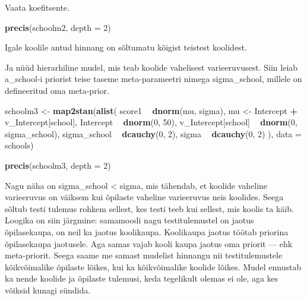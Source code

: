 \documentclass[]{book}
\newenvironment{Shaded}{\begin{snugshade}}{\end{snugshade}}
\newcommand{\DataTypeTok}[1]{\textcolor[rgb]{0.13,0.29,0.53}{#1}}
\newcommand{\DecValTok}[1]{\textcolor[rgb]{0.00,0.00,0.81}{#1}}
\newcommand{\KeywordTok}[1]{\textcolor[rgb]{0.13,0.29,0.53}{\textbf{#1}}}
\newcommand{\NormalTok}[1]{#1}
\newcommand{\OperatorTok}[1]{\textcolor[rgb]{0.81,0.36,0.00}{\textbf{#1}}}
\newcommand{\StringTok}[1]{\textcolor[rgb]{0.31,0.60,0.02}{#1}}
\begin{document}
Vaata koefitsente.

\begin{Shaded}
\begin{Highlighting}[]
\KeywordTok{precis}\NormalTok{(schoolm2, }\DataTypeTok{depth =} \DecValTok{2}\NormalTok{)}
\end{Highlighting}
\end{Shaded}

Igale koolile antud hinnang on sõltumatu kõigist teistest koolidest.

Ja nüüd hierarhiline mudel, mis teab koolide vahelisest varieeruvusest. Siin leiab a\_school-i priorist teise taseme meta-parameetri nimega sigma\_school, millele on defineeritud oma meta-prior.

\begin{Shaded}
\begin{Highlighting}[]
\NormalTok{schoolm3 <-}\StringTok{ }\KeywordTok{map2stan}\NormalTok{(}\KeywordTok{alist}\NormalTok{(}
\NormalTok{  score1 }\OperatorTok{~}\StringTok{ }\KeywordTok{dnorm}\NormalTok{(mu, sigma),}
\NormalTok{  mu <-}\StringTok{ }\NormalTok{Intercept }\OperatorTok{+}\StringTok{ }\NormalTok{v_Intercept[school],}
\NormalTok{  Intercept }\OperatorTok{~}\StringTok{ }\KeywordTok{dnorm}\NormalTok{(}\DecValTok{0}\NormalTok{, }\DecValTok{50}\NormalTok{),}
\NormalTok{  v_Intercept[school] }\OperatorTok{~}\StringTok{ }\KeywordTok{dnorm}\NormalTok{(}\DecValTok{0}\NormalTok{, sigma_school),}
\NormalTok{  sigma_school }\OperatorTok{~}\StringTok{ }\KeywordTok{dcauchy}\NormalTok{(}\DecValTok{0}\NormalTok{, }\DecValTok{2}\NormalTok{),}
\NormalTok{  sigma }\OperatorTok{~}\StringTok{ }\KeywordTok{dcauchy}\NormalTok{(}\DecValTok{0}\NormalTok{, }\DecValTok{2}\NormalTok{)}
\NormalTok{), }\DataTypeTok{data =}\NormalTok{ schools)}
\end{Highlighting}
\end{Shaded}

\begin{Shaded}
\begin{Highlighting}[]
\KeywordTok{precis}\NormalTok{(schoolm3, }\DataTypeTok{depth =} \DecValTok{2}\NormalTok{)}
\end{Highlighting}
\end{Shaded}

Nagu näha on sigma\_school \textless{} sigma, mis tähendab, et koolide vaheline varieeruvus on väiksem kui õpilaste vaheline varieeruvus neis koolides. Seega sõltub testi tulemus rohkem sellest, kes testi teeb kui sellest, mis koolis ta käib. Loogika on siin järgmine: samamoodi nagu testitulemustel on jaotus õpilasekaupa, on neil ka jaotus koolikaupa. Koolikaupa jaotus töötab priorina õpilasekaupa jaotusele. Aga samas vajab kooli kaupa jaotus oma priorit --- ehk meta-priorit. Seega saame me samast mudelist hinnangu nii testitulemustele kõikvõimalike õpilaste lõikes, kui ka kõikvõimalike koolide lõikes. Mudel ennustab ka nende koolide ja õpilaste tulemusi, keda tegelikult olemas ei ole, aga kes võiksid kunagi sündida.
\end{document}
